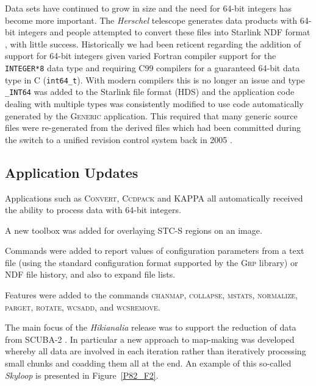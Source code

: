 \documentclass[11pt,twoside]{article}
\begin{document}
Data sets have continued to grow in size and the need for 64-bit
integers has become more important. The \textit{Herschel} telescope
generates data products with 64-bit integers and people attempted to
convert these files into Starlink NDF format \citep[see][for an
overview of NDF]{P91_adassxxiii}, with little success. Historically we
had been reticent regarding the addition of support for 64-bit
integers given varied Fortran compiler support for the
\texttt{INTEGER*8} data type and requiring C99 compilers for a
guaranteed 64-bit data type in C (\texttt{int64\_t}). With modern
compilers this is no longer an issue and type \texttt{\_INT64} was
added to the Starlink file format (HDS) and the application code
dealing with multiple types was consistently modified to use code
automatically generated by the \textsc{Generic} application. This
required that many generic source files were re-generated from the
derived files which had been committed during the switch to a unified
revision control system back in 2005 \citep{2005ASPC..347..119G}.

\subsection*{Application Updates}

Applications such as \textsc{Convert}, \textsc{Ccdpack} and
\textsc{KAPPA} all automatically received the ability to process data
with 64-bit integers.


A new toolbox was added for overlaying STC-S regions on an image.



Commands were added to report values of configuration parameters from
a text file (using the standard configuration format supported by the
\textsc{Grp} library) or NDF file history, and also to expand file lists.

Features were added to the commands \textsc{chanmap},
\textsc{collapse}, \textsc{mstats}, \textsc{normalize},
\textsc{parget}, \textsc{rotate}, \textsc{wcsadd}, and
\textsc{wcsremove}.


The main focus of the \textit{Hikianalia} release was to support the
reduction of data from SCUBA-2
\citep{2013MNRAS.430.2545C,2013MNRAS.430.2513H}. In particular a new
approach to map-making was developed whereby all data are involved in
each iteration rather than iteratively processing small chunks and
coadding them all at the end.  An example of this so-called
\textit{Skyloop} is presented in Figure~\ref{P82_F2}.
\end{document}
